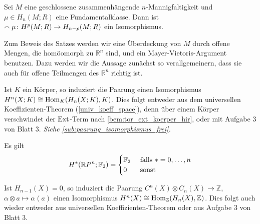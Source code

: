 \begin{satz}[{name={Dualitätssatz von Poincaré für geschlossene Mannigfaltigkeiten}},label=poincare]
	Sei $M$ eine geschlossene zusammenhängende $n$-Mannigfaltigkeit und $\mu \in H_n(M;R)$ eine Fundamentalklasse. 
	Dann ist $\smallfrown \mu \colon H^p(M;R) \to H_{n-p}(M;R)$ ein Isomorphismus.
\end{satz}

\begin{bemerkung}[{name=[Vorgehen zum Beweis des Dualitätssatzes]}]
	Zum Beweis des Satzes werden wir eine Überdeckung von $M$ durch offene Mengen, die homöomorph zu $\mathbb{R}^n$ sind, und ein Mayer-Vietoris-Argument benutzen.
	Dazu werden wir die Aussage zunächst so verallgemeinern, dass sie auch für offene Teilmengen des $\mathbb{R}^n$ richtig ist.
\end{bemerkung}

\begin{bemerkung}[{name=[{Paarung ist ein Isomorphismus, wenn ein Körper betrachtet wird}]},label=bem:paarung_iso_koerper]
	Ist $K$ ein Körper, so induziert die Paarung
	einen Isomorphismus $H^n(X;K) \cong \Hom_K \enbrace*{H_n(X;K),K}$. 
	Dies folgt entweder aus dem universellen Koeffizienten-Theorem (\autoref{univ_koeff_space}), denn über einem Körper verschwindet der $\operatorname{Ext}$-Term nach \autoref{bem:tor_ext_koerper_hir}, oder mit Aufgabe $3$ von Blatt $3$. \emph{Siehe \cref{sub:paarung_isomorphismus_frei}.}
\end{bemerkung}

\begin{beispiel}[{name=[Kohomologie des reell projektiven Raumes]}]
	Es gilt  
	\[
		H^* \enbrace*{\mathbb{R}P^n;\mathbb{F}_2} = \begin{cases}
			\mathbb{F}_2 &\text{ falls }*=0,\ldots ,n\\
			0 &\text{ sonst }
		\end{cases}
	\]
\end{beispiel}

\begin{bemerkung}[{name=[{Paarung ist ein Isomorphismus, wenn $n-1$-te Homologie verschwindet}]}]
	Ist $H_{n-1}(X)=0$, so induziert die Paarung $C^n(X) \otimes C_n(X) \to \mathbb{Z}$, $\alpha \otimes a \mapsto \alpha(a)$ einen Isomorphismus $H^n(X) \cong \Hom_\mathbb{Z} \enbrace*{H_n (X),\mathbb{Z}}$.
	Dies folgt auch wieder entweder aus universellen Koeffizienten-Theorem oder aus Aufgabe $3$ von Blatt $3$.
\end{bemerkung}

